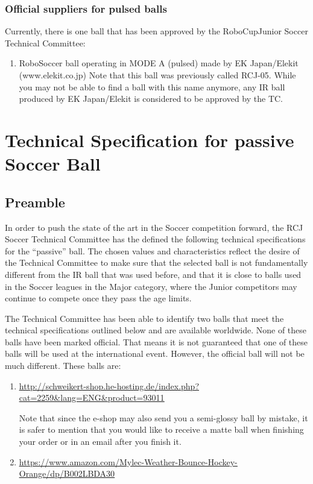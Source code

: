 \documentclass{article}
\begin{document}
\subsubsection{Official suppliers for pulsed balls}

Currently, there is one ball that has been approved by the RoboCupJunior Soccer
Technical Committee:

\begin{enumerate}
    \item RoboSoccer ball operating in MODE A (pulsed) made by EK Japan/Elekit (www.elekit.co.jp)
        Note that this ball was previously called RCJ-05. While
            you may not be able to find a ball with this name anymore, any IR
            ball produced by EK Japan/Elekit is considered to be approved by
            the TC.
\end{enumerate}

\section{Technical Specification for passive Soccer Ball\label{ref-passive-spec}}

\subsection{Preamble}

In order to push the state of the art in the Soccer competition forward, the
RCJ Soccer Technical Committee has the defined the following technical
specifications for the ``passive'' ball. The chosen values and characteristics
reflect the desire of the Technical Committee to make sure that the selected
ball is not fundamentally different from the IR ball that was used before, and
that it is close to balls used in the Soccer leagues in the Major category,
where the Junior competitors may continue to compete once they pass the age
limits.

The Technical Committee has been able to identify two balls that meet the
technical specifications outlined below and are available worldwide. None of
these balls have been marked official. That means it is not guaranteed that one
of these balls will be used at the international event. However, the official
ball will not be much different. These balls are:

\begin{enumerate}

\item \underline{\href{http://schweikert-shop.he-hosting.de/index.php?cat=2259&lang=ENG&product=93011}{http://schweikert-shop.he-hosting.de/index.php?cat=2259\&lang=ENG\&product=93011}}

    Note that since the e-shop may also send you a semi-glossy ball
        by mistake, it is safer to mention that you would like to receive a
        matte ball when finishing your order or in an email after you finish it.

\item \underline{\href{https://www.amazon.com/Mylec-Weather-Bounce-Hockey-Orange/dp/B002LBDA30}{https://www.amazon.com/Mylec-Weather-Bounce-Hockey-Orange/dp/B002LBDA30}}

\end{enumerate}
\end{document}
